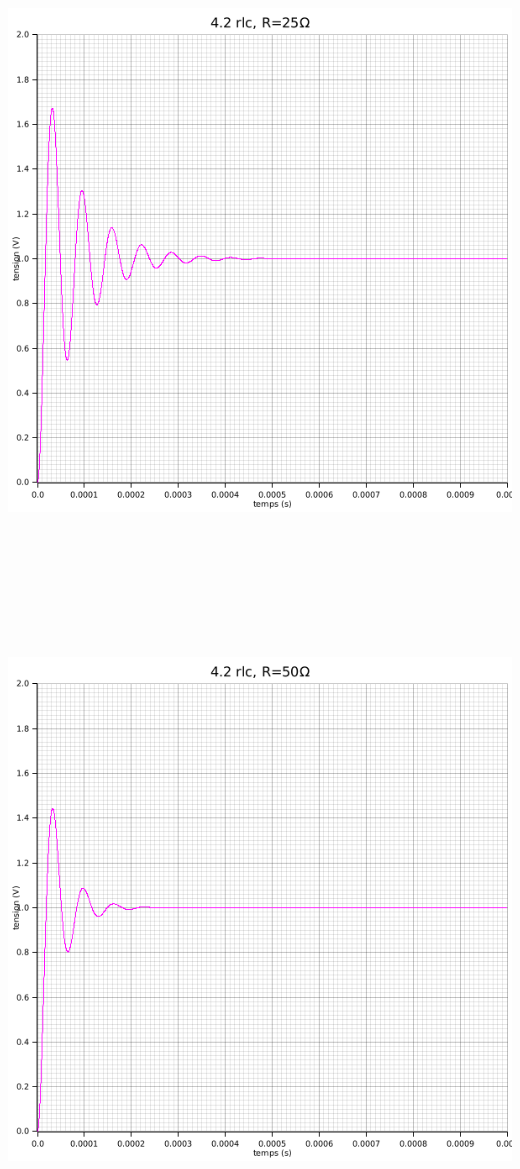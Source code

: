 \documentclass{article}
\begin{document}
{    \begin{center}
      \includegraphics[height=45em]{images/rlc25.png}
    \end{center}
    \begin{center}
      \includegraphics[height=45em]{images/rlc50.png}

\end{center}}
\end{document}
